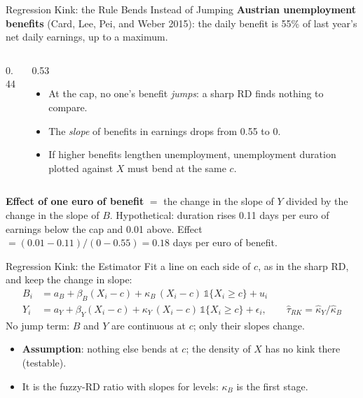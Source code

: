 \documentclass[aspectratio=169,11pt,xcolor=dvipsnames]{beamer}
\newcommand{\srcp}[1]{{\scriptsize\color{gray}(#1)}}
\begin{document}
\begin{frame}{Regression Kink: the Rule Bends Instead of Jumping}
\textbf{Austrian unemployment benefits} \srcp{Card, Lee, Pei, and Weber 2015}: the daily benefit is
55\% of last year's net daily earnings, up to a maximum.
\vskip2pt
\begin{columns}[T]
\begin{column}{0.44\linewidth}
\end{column}
\begin{column}{0.53\linewidth}
\small
\begin{itemize}\itemsep2pt
  \item At the cap, no one's benefit \emph{jumps}: a sharp RD finds nothing to compare.
  \item The \emph{slope} of benefits in earnings drops from 0.55 to 0.
  \item If higher benefits lengthen unemployment, unemployment duration plotted
        against $X$ must bend at the same $c$.
\end{itemize}
\end{column}
\end{columns}
\vskip4pt
\textbf{Effect of one euro of benefit} $=$ the change in the slope of $Y$
divided by the change in the slope of $B$.
\vskip2pt
{\small Hypothetical: duration rises 0.11 days per euro of earnings below the cap and
0.01 above. Effect $= (0.01 - 0.11)/(0 - 0.55) = 0.18$ days per euro of benefit.}
\end{frame}

\begin{frame}{Regression Kink: the Estimator}
Fit a line on each side of $c$, as in the sharp RD, and keep the change in slope:
\begin{align*}
  B_i &= a_B + \beta_B (X_i - c) + \kappa_B\,(X_i - c)\,\mathds 1\{X_i \geq c\} + u_i \\
  Y_i &= a_Y + \beta_Y (X_i - c) + \kappa_Y\,(X_i - c)\,\mathds 1\{X_i \geq c\} + \epsilon_i,
  \qquad \hat\tau_{RK} = \hat\kappa_Y / \hat\kappa_B
\end{align*}
No jump term: $B$ and $Y$ are continuous at $c$; only their slopes change.
\vskip3pt
\begin{itemize}\itemsep1pt
  \item \textbf{Assumption}: nothing else bends at $c$; the density of $X$ has no kink there (testable).
  \item It is the fuzzy-RD ratio with slopes for levels: $\kappa_B$ is the first stage.
\end{itemize}
\end{frame}
\end{document}
